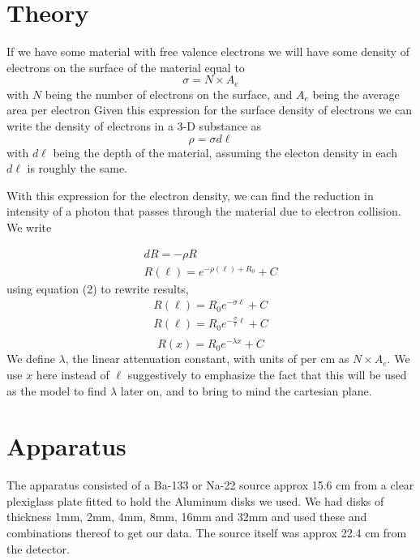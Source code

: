 \documentclass{article}
\begin{document}
\section{Theory}
	If we have some material with free valence electrons we will have some density of electrons on the surface of the material equal to 
	\begin{equation}
		\sigma = N \times A_{e}
	\end{equation}
	with $N$ being the number of electrons on the surface, and $A_{e}$ being the average area per electron
	Given this expression for the surface density of electrons we can write the density of electrons in a 3-D substance as
	\begin{equation}
		\rho = \sigma d\ell
	\end{equation}
	with $d\ell$ being the depth of the material, assuming the electon density in each $d\ell$ is roughly the same.
	\hspace{.5cm}
	\begin{flushleft}
	With this expression for the electron density, we can find the reduction in intensity of a photon that passes through the material due to electron collision.  We write
	\end{flushleft}
	\begin{gather*}
		dR = -\rho R\\
		R(\ell) = e^{-\rho(\ell) + R_0} + C
	\end{gather*}
	using equation (2) to rewrite results, 
	\begin{gather*}
		R(\ell) = R_0e^{-\sigma \ell} + C\\
		R(\ell) = R_0e^{-\frac{\sigma}{\ell} \ell} + C\\
	\end{gather*}
	\begin{equation}
		\boxed{R(x) = R_0e^{-\lambda x} + C}
	\end{equation}
	We define $\lambda$, the linear attenuation constant, with units of per cm as $N \times A_{e}$.  We use $x$ here instead of $\ell$ suggestively to emphasize the fact that this will be used as the model to find $\lambda$ later on, and to bring to mind the cartesian plane.


\section{Apparatus}
	The apparatus consisted of a Ba-133 or Na-22 source approx 15.6 cm from a clear plexiglass plate fitted to hold the Aluminum disks we used.  We had disks of thickness 1mm, 2mm, 4mm, 8mm, 16mm and 32mm and used these and combinations thereof to get our data.  The source itself was approx 22.4 cm from the detector.
\end{document}
